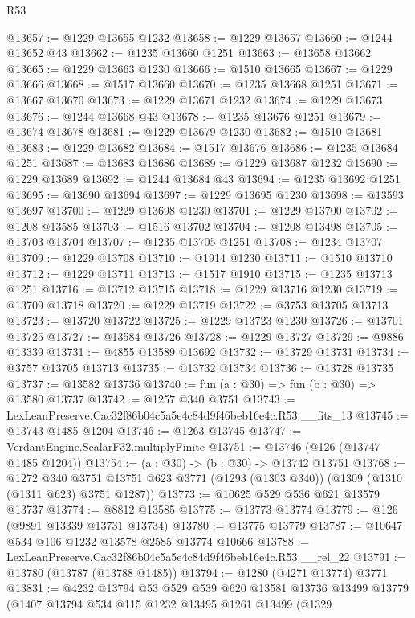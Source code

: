 \begin{lexlean}{R53}
\begin{coremodule}
@13657 := @1229 @13655 @1232
@13658 := @1229 @13657
@13660 := @1244 @13652 @43
@13662 := @1235 @13660 @1251
@13663 := @13658 @13662
@13665 := @1229 @13663 @1230
@13666 := @1510 @13665
@13667 := @1229 @13666
@13668 := @1517 @13660
@13670 := @1235 @13668 @1251
@13671 := @13667 @13670
@13673 := @1229 @13671 @1232
@13674 := @1229 @13673
@13676 := @1244 @13668 @43
@13678 := @1235 @13676 @1251
@13679 := @13674 @13678
@13681 := @1229 @13679 @1230
@13682 := @1510 @13681
@13683 := @1229 @13682
@13684 := @1517 @13676
@13686 := @1235 @13684 @1251
@13687 := @13683 @13686
@13689 := @1229 @13687 @1232
@13690 := @1229 @13689
@13692 := @1244 @13684 @43
@13694 := @1235 @13692 @1251
@13695 := @13690 @13694
@13697 := @1229 @13695 @1230
@13698 := @13593 @13697
@13700 := @1229 @13698 @1230
@13701 := @1229 @13700
@13702 := @1208 @13585
@13703 := @1516 @13702
@13704 := @1208 @13498
@13705 := @13703 @13704
@13707 := @1235 @13705 @1251
@13708 := @1234 @13707
@13709 := @1229 @13708
@13710 := @1914 @1230
@13711 := @1510 @13710
@13712 := @1229 @13711
@13713 := @1517 @1910
@13715 := @1235 @13713 @1251
@13716 := @13712 @13715
@13718 := @1229 @13716 @1230
@13719 := @13709 @13718
@13720 := @1229 @13719
@13722 := @3753 @13705 @13713
@13723 := @13720 @13722
@13725 := @1229 @13723 @1230
@13726 := @13701 @13725
@13727 := @13584 @13726
@13728 := @1229 @13727
@13729 := @9886 @13339
@13731 := @4855 @13589 @13692
@13732 := @13729 @13731
@13734 := @3757 @13705 @13713
@13735 := @13732 @13734
@13736 := @13728 @13735
@13737 := @13582 @13736
@13740 := fun (a : @30) => fun (b : @30) => @13580 @13737
@13742 := @1257 @340 @3751
@13743 := LexLeanPreserve.Cac32f86b04c5a5e4c84d9f46beb16e4c.R53.__fits_13
@13745 := @13743 @1485 @1204
@13746 := @1263 @13745
@13747 := VerdantEngine.ScalarF32.multiplyFinite
@13751 := @13746 (@126 (@13747 @1485 @1204))
@13754 := (a : @30) -> (b : @30) -> @13742 @13751
@13768 := @1272
    @340
    @3751
    @13751
    @623
    @3771
    (@1293 (@1303 @340))
    (@1309 (@1310 (@1311 @623) @3751 @1287))
@13773 := @10625 @529 @536 @621 @13579 @13737
@13774 := @8812 @13585
@13775 := @13773 @13774
@13779 := @126 (@9891 @13339 @13731 @13734)
@13780 := @13775 @13779
@13787 := @10647 @534 @106 @1232 @13578 @2585 @13774 @10666
@13788 := LexLeanPreserve.Cac32f86b04c5a5e4c84d9f46beb16e4c.R53.__rel_22
@13791 := @13780 (@13787 (@13788 @1485))
@13794 := @1280 (@4271 @13774) @3771
@13831 := @4232
    @13794
    @53
    @529
    @539
    @620
    @13581
    @13736
    @13499
    @13779
    (@1407
      @13794
      @534
      @115
      @1232
      @13495
      @1261
      @13499
      (@1329

\end{coremodule}
\end{lexlean}
